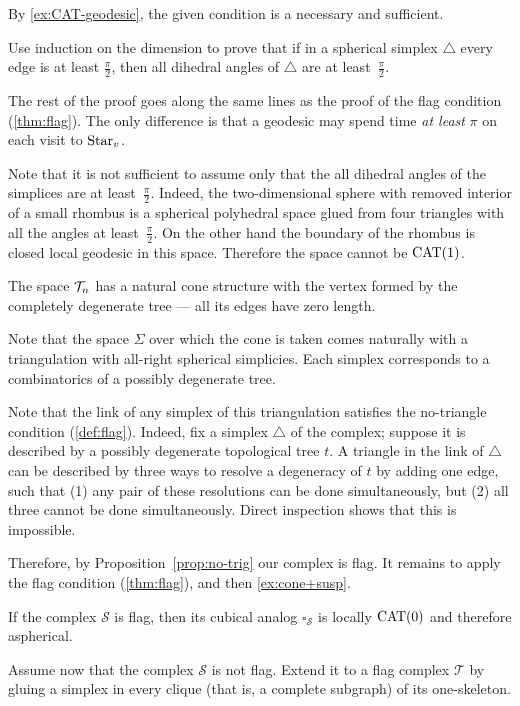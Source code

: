 By \ref{ex:CAT-geodesic}, the given condition is a necessary and sufficient.

Use induction on the dimension  to prove that if in a spherical simplex $\triangle$ every edge is at least $\tfrac\pi2$, then 
all dihedral angles of $\triangle$ are at least~$\tfrac\pi2$.

The rest of the proof goes along the same lines as the proof of the flag condition (\ref{thm:flag}).
The only difference is that a geodesic may spend time {}\emph{at least} $\pi$ on each visit to $\mathop{\rm Star}\nolimits_v$.

Note that it is not sufficient to assume only that the all dihedral angles of the simplices are at least~$\tfrac\pi2$. 
Indeed, the two-dimensional sphere with removed interior of a small rhombus is a spherical polyhedral space glued from four triangles with all the angles at least~$\tfrac\pi2$.
On the other hand the boundary of the rhombus is closed local geodesic in this space.
Therefore the space cannot be $\mathrm{CAT}(1)$.

The space $\mathcal{T}_n$ has a natural cone structure with the vertex formed by the  completely degenerate tree --- all its edges have zero length.

Note that the space $\Sigma$
over which the cone is taken comes naturally with a triangulation 
with all-right spherical simplicies.
Each simplex corresponds to a combinatorics of a possibly degenerate tree.

Note that the link of any simplex of this triangulation satisfies the no-triangle condition (\ref{def:flag}).
Indeed, fix a simplex $\triangle$ of the complex;
suppose it is described by a possibly degenerate topological tree $t$.
A triangle in the link of  $\triangle$ can be described by three ways to resolve a degeneracy of $t$ by adding one edge,
such that (1) any pair of these resolutions can be done simultaneously, but (2) all three cannot be done simultaneously.
Direct inspection shows that this is impossible.

Therefore, by Proposition~\ref{prop:no-trig} our complex is flag.
It remains to apply the flag condition (\ref{thm:flag}), and then \ref{ex:cone+susp}.

If the complex $\mathcal{S}$ is flag, then its cubical analog $\square_{\mathcal{S}}$ is locally $\mathrm{CAT}(0)$ and therefore aspherical.

Assume now that the complex $\mathcal{S}$ is not flag. 
Extend it to a flag complex $\mathcal{T}$ by gluing a simplex in every clique (that is, a complete subgraph) of its one-skeleton.

